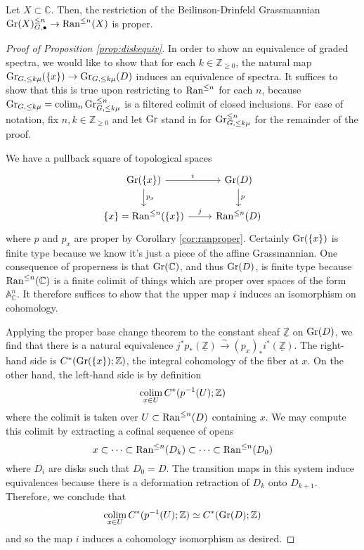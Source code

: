 \begin{cor}\label{cor:ranproper}
Let $X\subset \mathbb{C}$.  Then, the restriction of the Beilinson-Drinfeld Grassmannian $\operatorname{\mathrm{Gr}}(X)_{G,\bullet}^{\leq n} \to \mathrm{Ran}^{\leq n}(X)$ is proper.
\end{cor}

\begin{proof}[Proof of Proposition \ref{prop:diskequiv}]
In order to show an equivalence of graded spectra, we would like to show that for each $k\in \mathbb{Z}_{\geq 0}$, the natural map $\operatorname{\mathrm{Gr}}_{G,\leq k \mu}(\{ x\}) \to \operatorname{\mathrm{Gr}}_{G,\leq k\mu}(D)$ induces an equivalence of spectra.  It suffices to show that this is true upon restricting to $\operatorname{\mathrm{Ran}}^{\leq n}$ for each $n$, because $\operatorname{\mathrm{Gr}}_{G, \leq k \mu} = \operatorname*{\mathrm{colim}}_n \operatorname{\mathrm{Gr}}^{\leq n}_{G,\leq k\mu}$ is a filtered colimit of closed inclusions.  For ease of notation, fix $n,k\in \mathbb{Z}_{\geq 0}$ and let $\operatorname{\mathrm{Gr}}$ stand in for $\operatorname{\mathrm{Gr}}^{\leq n}_{G,\leq k \mu}$ for the remainder of the proof.  

We have a pullback square of topological spaces 
\begin{equation*}
\begin{tikzcd}
\Gra (\{ x\}) \arrow[r,"i"]\arrow[d,"p_x"] & \Gra (D) \arrow[d,"p"]\\
\{x \} = \Ran^{\leq n}(\{ x\} )\arrow[r,"j"] & \Ran^{\leq n}(D)
\end{tikzcd} \end{equation*}
where $p$ and $p_x$ are proper by Corollary \ref{cor:ranproper}.  Certainly $\operatorname{\mathrm{Gr}}(\{ x\})$ is finite type because we know it's just a piece of the affine Grassmannian.  One consequence of properness is that $\operatorname{\mathrm{Gr}}(\mathbb{C})$, and thus $\operatorname{\mathrm{Gr}}(D)$, is finite type because $\operatorname{\mathrm{Ran}}^{\leq n}(\mathbb{C})$ is a finite colimit of things which are proper over spaces of the form $\mathbb{A}^n_{\mathbb{C}}$.  It therefore suffices to show that the upper map $i$ induces an isomorphism on cohomology.  

Applying the proper base change theorem to the constant sheaf $\underline{\mathbb{Z}}$ on $\operatorname{\mathrm{Gr}}(D)$, we find that there is a natural equivalence $j^*p_*(\underline{\mathbb{Z}}) \xrightarrow{\sim} (p_x)_{*}i^*(\underline{\mathbb{Z}}).$  The right-hand side is $C^*(\operatorname{\mathrm{Gr}}(\{x\}) ;\mathbb{Z})$, the integral cohomology of the fiber at $x$.  On the other hand, the left-hand side is by definition $$\operatorname*{\mathrm{colim}}_{x\in U} C^*(p^{-1}(U);\mathbb{Z})$$ where the colimit is taken over $U\subset \operatorname{\mathrm{Ran}}^{\leq n}(D)$ containing $x$.  We may compute this colimit by extracting a cofinal sequence of opens $$x \subset \cdots \subset \operatorname{\mathrm{Ran}}^{\leq n}(D_k) \subset \cdots \subset \operatorname{\mathrm{Ran}}^{\leq n}(D_0)$$ where $D_i$ are disks such that $D_0=D$.  The transition maps in this system induce equivalences because there is a deformation retraction of $D_k$ onto $D_{k+1}$.  Therefore, we conclude that $$\operatorname*{\mathrm{colim}}_{x\in U} C^*(p^{-1}(U);\mathbb{Z}) \simeq C^*(\operatorname{\mathrm{Gr}}(D); \mathbb{Z})$$ and so the map $i$ induces a cohomology isomorphism as desired.  
\end{proof} 


